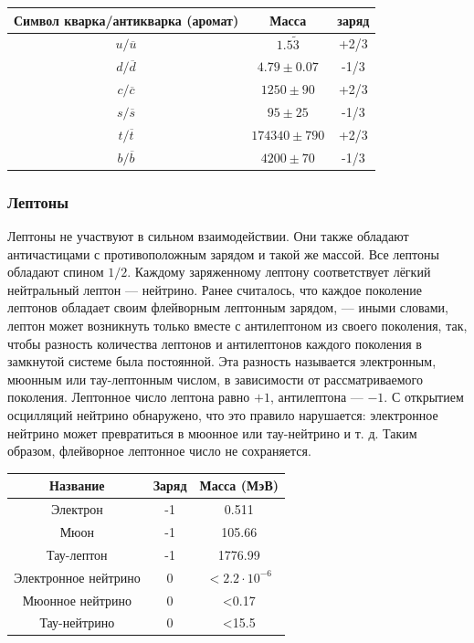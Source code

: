 \documentclass[a4paper,14pt]{article}
\begin{document}
\begin{center}
\begin{tabular}{|c|c|c|}
\hline
Символ кварка/антикварка (аромат)&Масса&заряд\\
\hline
$u/\overline{u}$&$1.5 \tilde 3$&+2/3\\
\hline
$d/\overline{d}$&$4.79 \pm 0.07$&-1/3\\
\hline
$c/\overline{c}$&$1250 \pm 90$&+2/3\\
\hline
$s/\overline{s}$&$95 \pm 25$&-1/3\\
\hline
$t/\overline{t}$&$174340 \pm 790$&+2/3\\
\hline
$b/\overline{b}$&$4200 \pm 70$&-1/3\\
\hline
\end{tabular}
\end{center}

\subsubsection*{Лептоны}

Лептоны не участвуют в сильном взаимодействии. Они также обладают античастицами с противоположным зарядом и такой же массой. Все лептоны обладают спином $1/2$. Каждому заряженному лептону соответствует лёгкий нейтральный лептон — нейтрино. Ранее считалось, что каждое поколение лептонов обладает своим флейворным лептонным зарядом, — иными словами, лептон может возникнуть только вместе с антилептоном из своего поколения, так, чтобы разность количества лептонов и антилептонов каждого поколения в замкнутой системе была постоянной. Эта разность называется электронным, мюонным или тау-лептонным числом, в зависимости от рассматриваемого поколения. Лептонное число лептона равно $+1$, антилептона — $-1$. С открытием осцилляций нейтрино обнаружено, что это правило нарушается: электронное нейтрино может превратиться в мюонное или тау-нейтрино и т. д. Таким образом, флейворное лептонное число не сохраняется.

\begin{center}
\begin{tabular}{|c|c|c|}
\hline
Название&Заряд&Масса (МэВ)\\
\hline
Электрон&-1&0.511\\
\hline
Мюон&-1&105.66\\
\hline
Тау-лептон&-1&1776.99\\
\hline
Электронное нейтрино&0&$<2.2 \cdot 10^{-6}$\\
\hline
Мюонное нейтрино&0&<0.17\\
\hline
Тау-нейтрино&0&<15.5\\
\hline
\end{tabular}
\end{center}
\end{document}
